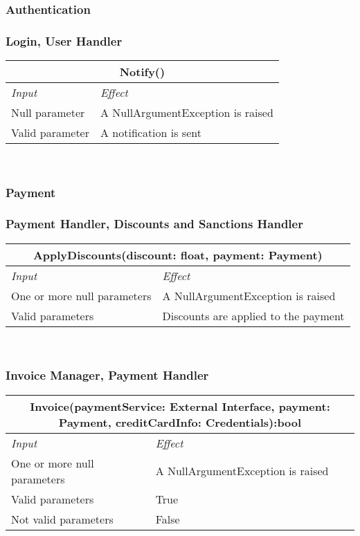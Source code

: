 	\label{sec: individual_steps_4}
	\subsubsection{Authentication}
		\subsubsection*{Login, User Handler }
			\begin{tabular}{ |l|l| }
				\hline
				\multicolumn{2}{|c|}{Notify()}\\
				\hline 
				\textit{Input}&\textit{Effect}\\ \hline
				Null parameter & A NullArgumentException is raised\\ \hline
				Valid parameter & A notification is sent \\ \hline
			\end{tabular}
			\\

	 \subsubsection{Payment}
		 \subsubsection*{Payment Handler, Discounts and Sanctions Handler }
			\begin{tabular}{ |l|l| }
				\hline
				\multicolumn{2}{|c|}{ApplyDiscounts(discount: float, payment: Payment)}\\
				\hline 
				\textit{Input}&\textit{Effect}\\ \hline
				One or more null parameters & A NullArgumentException is raised\\ \hline
				Valid parameters & Discounts are applied to the payment \\ \hline
			\end{tabular}
			\\
			
		\subsubsection*{Invoice Manager, Payment Handler}
			\begin{tabular}{ |l|l| }
				\hline
				\multicolumn{2}{|c|}{Invoice(paymentService: External Interface, payment: Payment, creditCardInfo: Credentials):bool}\\
				\hline 
				\textit{Input}&\textit{Effect}\\ \hline
				One or more null parameters & A NullArgumentException is raised\\ \hline
				Valid parameters & True \\ \hline
				Not valid parameters & False \\ \hline
			\end{tabular}
			\\
			
